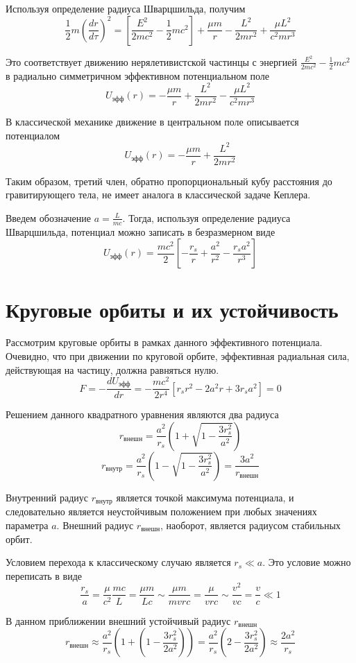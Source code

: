 \documentclass[14pt, a4paper]{report}
\begin{document}
Используя определение радиуса Шварцшильда, получим
\[\frac{1}{2}m\left(\frac{dr}{d\tau}\right)^2=\left[\frac{E^2}{2mc^2}-\frac{1}{2}mc^2\right]+\frac{\mu m}{r}-\frac{L^2}{2mr^2}+\frac{\mu L^2}{c^2 mr^3}\]

Это соответствует движению нерялетивистской частинцы с энергией $\frac{E^2}{2mc^2}-\frac{1}{2}mc^2$ в радиально симметричном эффективном потенциальном поле
\[U_{эфф}(r)=-\frac{\mu m}{r}+\frac{L^2}{2mr^2}-\frac{\mu L^2}{c^2 mr^3}\]

В классической механике движение в центральном поле описывается потенциалом
\[U_{эфф}(r)=-\frac{\mu m}{r}+\frac{L^2}{2mr^2}\]

Таким образом, третий член, обратно пропорциональный кубу расстояния до гравитирующего тела, не имеет аналога в классической задаче Кеплера.

Введем обозначение $a=\frac{L}{mc}$. Тогда, используя определение радиуса Шварцшильда, потенциал можно записать в безразмерном виде
\[U_{эфф}(r)=\frac{mc^2}{2}\left[-\frac{r_s}{r}+\frac{a^2}{r^2}-\frac{r_s a^2}{r^3}\right]\]

\section{Круговые орбиты и их устойчивость}

Рассмотрим круговые орбиты в рамках данного эффективного потенциала. Очевидно, что при движении по круговой орбите, эффективная радиальная сила, действующая на частицу, должна равняться нулю.
\[F=-\frac{dU_{эфф}}{dr}=-\frac{mc^2}{2r^4}\left[r_s r^2-2a^2 r+3r_s a^2\right]=0\]

Решением данного квадратного уравнения являются два радиуса
\[r_{внешн}=\frac{a^2}{r_s}\left(1+\sqrt{1-\frac{3r_s^2}{a^2}}\right)\]
\[r_{внутр}=\frac{a^2}{r_s}\left(1-\sqrt{1-\frac{3r_s^2}{a^2}}\right)=\frac{3a^2}{r_{внешн}}\]

Внутренний радиус $r_{внутр}$ является точкой максимума потенциала, и следовательно является неустойчивым положением при любых значениях параметра $a$. Внешний радиус $r_{внешн}$, наоборот, является радиусом стабильных орбит.

Условием перехода к классическому случаю является $r_s\ll a$. Это условие можно переписать в виде
\[\frac{r_s}{a}=\frac{\mu}{c^2}\frac{mc}{L}=\frac{\mu m}{Lc}\sim\frac{\mu m}{mvrc}=\frac{\mu}{vrc}\sim\frac{v^2}{vc}=\frac{v}{c}\ll 1\]

В данном приближении внешний устойчивый радиус $r_{внешн}$
\[r_{внешн}\approx\frac{a^2}{r_s}\left(1+\left(1-\frac{3r_s^2}{2a^2}\right)\right)=\frac{a^2}{r_s}\left(2-\frac{3r_s^2}{2a^2}\right)\approx\frac{2a^2}{r_s}\]
\end{document}
